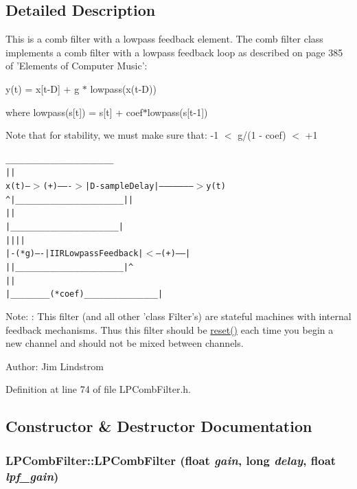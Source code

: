 \subsection{Detailed Description}
This is a comb filter with a lowpass feedback element. The comb filter class implements a comb filter with a lowpass feedback loop as described on page 385 of 'Elements of Computer Music':

y(t) = x\mbox{[}t-D\mbox{]} + g $\ast$ lowpass(x(t-D))\par
 where lowpass(s\mbox{[}t\mbox{]}) = s\mbox{[}t\mbox{]} + coef$\ast$lowpass(s\mbox{[}t-1\mbox{]})

Note that for stability, we must make sure that: -1 $<$ g/(1 - coef) $<$ +1 \small\begin{alltt}
                       \_\_\_\_\_\_\_\_\_\_\_\_\_\_\_\_\_\_\_\_\_\_
                      |                      |
  x(t) ---$>$(+)-------$>$|    D-sample Delay    |--------------------$>$ y(t)
            ^         |\_\_\_\_\_\_\_\_\_\_\_\_\_\_\_\_\_\_\_\_\_\_|           |
            |                                            |
            |          \_\_\_\_\_\_\_\_\_\_\_\_\_\_\_\_\_\_\_\_\_\_            |
            |         |                      |           |
            |-(*g)----| IIR Lowpass Feedback |$<$--(+)-----|
                   |  |\_\_\_\_\_\_\_\_\_\_\_\_\_\_\_\_\_\_\_\_\_\_|    ^
                   |                              |
                   |\_\_\_\_\_\_\_\_(*coef)\_\_\_\_\_\_\_\_\_\_\_\_\_\_\_|
 \end{alltt}\normalsize 


\begin{Desc}
\item[Note:]: This filter (and all other 'class Filter's) are stateful machines with internal feedback mechanisms. Thus this filter should be \hyperlink{classLPCombFilter_a3}{reset()} each time you begin a new channel and should not be mixed between channels.\end{Desc}
\begin{Desc}
\item[Author:]Jim Lindstrom \end{Desc}




Definition at line 74 of file LPComb\-Filter.h.

\subsection{Constructor \& Destructor Documentation}
\hypertarget{classLPCombFilter_a0}{
\subsubsection[LPCombFilter]{\setlength{\rightskip}{0pt plus 5cm}LPComb\-Filter::LPComb\-Filter (float {\em gain}, long {\em delay}, float {\em lpf\_\-gain})}}
\label{classLPCombFilter_a0}


